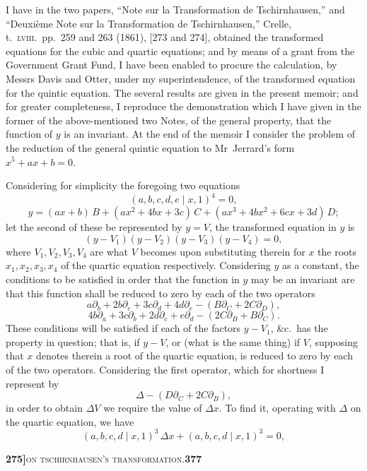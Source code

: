 \documentclass[11pt]{article}
\newcommand{\Cdel}{\mid}
\begin{document}
I have in the two papers, ``Note sur la Transformation de Tschirnhausen,'' and ``Deuxi\`eme Note sur la Transformation de Tschirnhausen,'' Crelle, t.~\textsc{lviii}.\ pp.~259 and 263 (1861), [273 and 274], obtained the transformed equations for the cubic and quartic equations; and by means of a grant from the Government Grant Fund, I have been enabled to procure the calculation, by Messrs Davis and Otter, under my superintendence, of the transformed equation for the quintic equation. The several results are given in the present memoir; and for greater completeness, I reproduce the demonstration which I have given in the former of the above-mentioned two Notes, of the general property, that the function of $y$ is an invariant. At the end of the memoir I consider the problem of the reduction of the general quintic equation to Mr~Jerrard's form $x^5 + a x + b = 0$.

\medskip

Considering for simplicity the foregoing two equations
\[
(a, b, c, d, e \Cdel x, 1)^4 = 0,
\]
\[
y = (a x + b)\, B + (a x^2 + 4 b x + 3 c)\, C + (a x^3 + 4 b x^2 + 6 c x + 3 d)\, D;
\]
let the second of these be represented by $y = V$, the transformed equation in $y$ is
\[
(y - V_1)(y - V_2)(y - V_3)(y - V_4) = 0,
\]
where $V_1, V_2, V_3, V_4$ are what $V$ becomes upon substituting therein for $x$ the roots $x_1, x_2, x_3, x_4$ of the quartic equation respectively. Considering $y$ as a constant, the conditions to be satisfied in order that the function in $y$ may be an invariant are that this function shall be reduced to zero by each of the two operators
\[
a \partial_b + 2 b \partial_c + 3 c \partial_d + 4 d \partial_e - (B \partial_C + 2 C \partial_D),
\]
\[
4 b \partial_a + 3 c \partial_b + 2 d \partial_c + e \partial_d - (2 C \partial_B + B \partial_C).
\]
These conditions will be satisfied if each of the factors $y - V_1$, \&c.\ has the property in question; that is, if $y - V$, or (what is the same thing) if $V$, supposing that $x$ denotes therein a root of the quartic equation, is reduced to zero by each of the two operators. Considering the first operator, which for shortness I represent by
\[
\Delta - (D \partial_C + 2 C \partial_B),
\]
in order to obtain $\Delta V$ we require the value of $\Delta x$. To find it, operating with $\Delta$ on the quartic equation, we have
\[
(a, b, c, d \Cdel x, 1)^3\, \Delta x + (a, b, c, d \Cdel x, 1)^3 = 0,
\]

\newpage
\noindent\textbf{275]}\hfill\textsc{on tschirnhausen's transformation.}\hfill\textbf{377}
\end{document}
